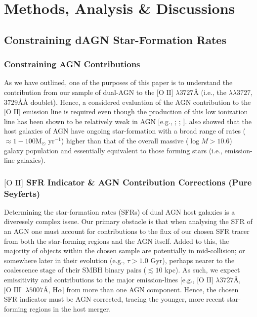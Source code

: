 \section{Methods, Analysis \& Discussions}
\subsection{Constraining dAGN Star-Formation Rates}
\subsubsection{Constraining AGN Contributions}

As we have outlined, one of the purposes of this paper is to understand the contribution from our sample of dual-AGN to the $\text{[O II]}$ $\lambda{3727}Å$ (i.e., the $\lambda\lambda{3727}$,$3729ÅÅ$ doublet). Hence, a considered evaluation of the AGN contribution to the [O II] emission line is required even though the production of this low ionization line has been shown to be relatively weak in AGN [e.g., \cite{Ferland_1986}; \cite{Ho_1993}; \cite{2006ApJ...642..702K}]. \cite{2009ApJ...696..396S} also showed that the host galaxies of AGN have ongoing star-formation with a broad range of rates ($\approx{1-100}$M$_{\odot}$ yr$^{-1}$) higher than that of the overall massive ($\log{M}>{10.6}$) galaxy population and essentially equivalent to those forming stars (i.e., emission-line galaxies).

\subsubsection{${\text{[O II]}}$ SFR Indicator \& AGN Contribution Corrections (Pure Seyferts)}

Determining the star-formation rates (SFRs) of dual AGN host galaxies is a diveresely complex issue. Our primary obstacle is that when analysing the SFR of an AGN one must account for contributions to the flux of our chosen SFR tracer from both the star-forming regions and the AGN itself. Added to this, the majority of objects within the chosen sample are potentially in mid-collision; or somewhere later in their evolution (e.g., ${\tau}>{1.0}$ Gyr), perhaps nearer to the coalescence stage of their SMBH binary pairs ($\lesssim{10}$ kpc). As such, we expect emissitivity and contributions to the major emission-lines [e.g., $\text{[O II]}$ $\lambda{3727}Å$, $\text{[O III]}$ $\lambda{5007}Å$, $\text{H}\alpha$] from more than one AGN component. Hence, the chosen SFR indicator must be AGN corrected, tracing the younger, more recent star-forming regions in the host merger. 

